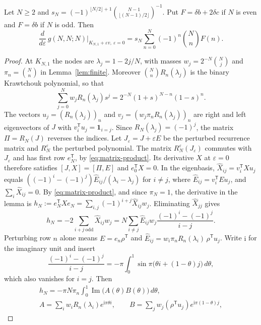 \begin{lemma}\label{lem:corner}
Let $N\geq2$ and $s_N=(-1)^{\lfloor N/2\rfloor+1}\binom{N-1}{\lfloor(N-1)/2\rfloor}^{-1}$. Put $F=\delta b+2\delta c$ if $N$ is even and $F=\delta b$ if $N$ is odd. Then
\[
\frac{d}{d\varepsilon}\,g(N,N;N)\Big|_{K_{N,1}+\varepsilon v,\ \varepsilon=0}=s_N\sum_{n=0}^N(-1)^n\binom NnF(n).
\]
\end{lemma}
\begin{proof}
At $K_{N,1}$ the nodes are $\lambda_j=1-2j/N$, with masses $w_j=2^{-N}\binom Nj$ and $\pi_n=\binom Nn$ in Lemma~\ref{lem:finite}. Moreover $\binom Nn R_n(\lambda_j)$ is the binary Krawtchouk polynomial, so that
\begin{equation}\label{eq:kraw-gf}
\sum_{j=0}^N w_jR_n(\lambda_j)s^j=2^{-N}(1+s)^{N-n}(1-s)^n.
\end{equation}
The vectors $u_j=(R_n(\lambda_j))_n$ and $v_j=(w_j\pi_nR_n(\lambda_j))_n$ are right and left eigenvectors of $J$ with $v_i^\mathsf Tu_j=\boldsymbol1_{i=j}$. Since $R_N(\lambda_j)=(-1)^j$, the matrix $\Pi=R_N(J)$ reverses the indices. Let $J_\varepsilon=J+\varepsilon E$ be the perturbed recurrence matrix and $R_N^\varepsilon$ the perturbed polynomial. The matrix $R_N^\varepsilon(J_\varepsilon)$ commutes with $J_\varepsilon$ and has first row $e_N^\mathsf T$, by \eqref{eq:matrix-product}. Its derivative $X$ at $\varepsilon=0$ therefore satisfies $[J,X]=[\Pi,E]$ and $e_0^\mathsf TX=0$. In the eigenbasis, $\widehat X_{ij}=v_i^\mathsf TXu_j$ equals $((-1)^i-(-1)^j)\widehat E_{ij}/(\lambda_i-\lambda_j)$ for $i\neq j$, where $\widehat E_{ij}=v_i^\mathsf TEu_j$, and $\sum_i\widehat X_{ij}=0$. By \eqref{eq:matrix-product}, and since $\pi_N=1$, the derivative in the lemma is $h_N:=e_N^\mathsf TXe_N=\sum_{i,j}(-1)^{i+j}\widehat X_{ij}w_j$. Eliminating $\widehat X_{jj}$ gives
\[
h_N=-2\sum_{i+j\ \mathrm{odd}}\widehat X_{ij}w_j=N\sum_{i\neq j}\widehat E_{ij}w_j\frac{(-1)^i-(-1)^j}{i-j}.
\]
Perturbing row $n$ alone means $E=e_n\rho^\mathsf T$ and $\widehat E_{ij}=w_i\pi_nR_n(\lambda_i)\,\rho^\mathsf Tu_j$. Write $\mathrm i$ for the imaginary unit and insert
\[
\frac{(-1)^i-(-1)^j}{i-j}=-\pi\int_0^1\sin\pi\bigl(\theta i+(1-\theta)j\bigr)\,d\theta,
\]
which also vanishes for $i=j$. Then
\begin{gather*}
h_N=-\pi N\pi_n\int_0^1\operatorname{Im}\bigl(A(\theta)B(\theta)\bigr)\,d\theta,\\
A=\sum_iw_iR_n(\lambda_i)e^{\mathrm i\pi\theta i},\qquad
B=\sum_jw_j(\rho^\mathsf Tu_j)e^{\mathrm i\pi(1-\theta)j},
\end{gather*}

\end{proof}
